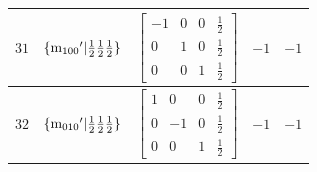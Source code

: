 \documentclass[fleqn,8pt]{jsarticle}
\begin{document}
\begin{longtable}{ccccc}
$ 31 $ & $ \{{\rm m}_{100}{}'|\frac{1}{2} \frac{1}{2} \frac{1}{2}\} $ & $ \begin{bmatrix} -1 & 0 & 0 & \frac{1}{2} \\ 0 & 1 & 0 & \frac{1}{2} \\ 0 & 0 & 1 & \frac{1}{2} \end{bmatrix} $ & $ -1 $ & $ -1 $ \\ \hline
$ 32 $ & $ \{{\rm m}_{010}{}'|\frac{1}{2} \frac{1}{2} \frac{1}{2}\} $ & $ \begin{bmatrix} 1 & 0 & 0 & \frac{1}{2} \\ 0 & -1 & 0 & \frac{1}{2} \\ 0 & 0 & 1 & \frac{1}{2} \end{bmatrix} $ & $ -1 $ & $ -1 $ \\
\end{longtable}
\end{document}

